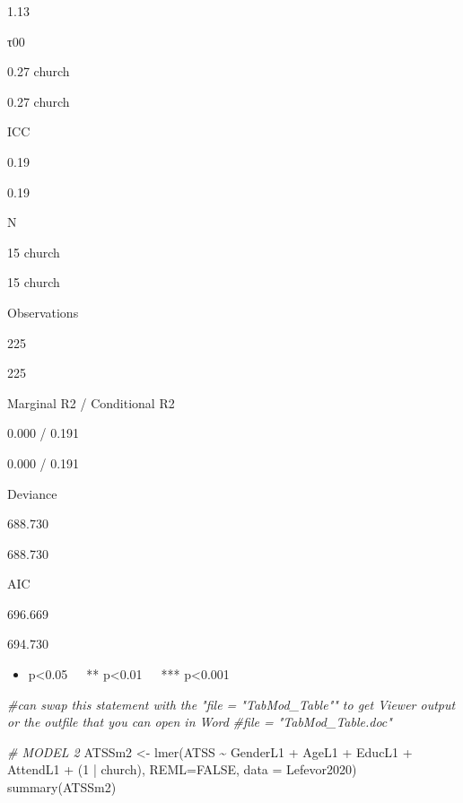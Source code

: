 \documentclass[
  11pt,
]{book}
\newenvironment{Shaded}{\begin{snugshade}}{\end{snugshade}}
\newcommand{\AttributeTok}[1]{\textcolor[rgb]{0.77,0.63,0.00}{#1}}
\newcommand{\CommentTok}[1]{\textcolor[rgb]{0.56,0.35,0.01}{\textit{#1}}}
\newcommand{\ConstantTok}[1]{\textcolor[rgb]{0.00,0.00,0.00}{#1}}
\newcommand{\DecValTok}[1]{\textcolor[rgb]{0.00,0.00,0.81}{#1}}
\newcommand{\FunctionTok}[1]{\textcolor[rgb]{0.00,0.00,0.00}{#1}}
\newcommand{\NormalTok}[1]{#1}
\newcommand{\OtherTok}[1]{\textcolor[rgb]{0.56,0.35,0.01}{#1}}
\newcommand{\SpecialCharTok}[1]{\textcolor[rgb]{0.00,0.00,0.00}{#1}}
\providecommand{\tightlist}{%
  \setlength{\itemsep}{0pt}\setlength{\parskip}{0pt}}
\begin{document}
1.13

τ00

0.27 church

0.27 church

ICC

0.19

0.19

N

15 church

15 church

Observations

225

225

Marginal R2 / Conditional R2

0.000 / 0.191

0.000 / 0.191

Deviance

688.730

688.730

AIC

696.669

694.730

\begin{itemize}
\tightlist
\item
  p\textless0.05~~~** p\textless0.01~~~*** p\textless0.001
\end{itemize}

\begin{Shaded}
\begin{Highlighting}[]
\CommentTok{\#can swap this statement with the "file = "TabMod\_Table"" to get Viewer output or the outfile that you can open in Word}
\CommentTok{\#file = "TabMod\_Table.doc"}
\end{Highlighting}
\end{Shaded}

\begin{Shaded}
\begin{Highlighting}[]
\CommentTok{\# MODEL 2}
\NormalTok{ATSSm2 }\OtherTok{\textless{}{-}} \FunctionTok{lmer}\NormalTok{(ATSS }\SpecialCharTok{\textasciitilde{}}\NormalTok{ GenderL1 }\SpecialCharTok{+}\NormalTok{ AgeL1 }\SpecialCharTok{+}\NormalTok{ EducL1 }\SpecialCharTok{+}\NormalTok{ AttendL1 }\SpecialCharTok{+}\NormalTok{ (}\DecValTok{1} \SpecialCharTok{|}\NormalTok{ church), }\AttributeTok{REML=}\ConstantTok{FALSE}\NormalTok{, }\AttributeTok{data =}\NormalTok{ Lefevor2020)}
\FunctionTok{summary}\NormalTok{(ATSSm2)}
\end{Highlighting}
\end{Shaded}
\end{document}
